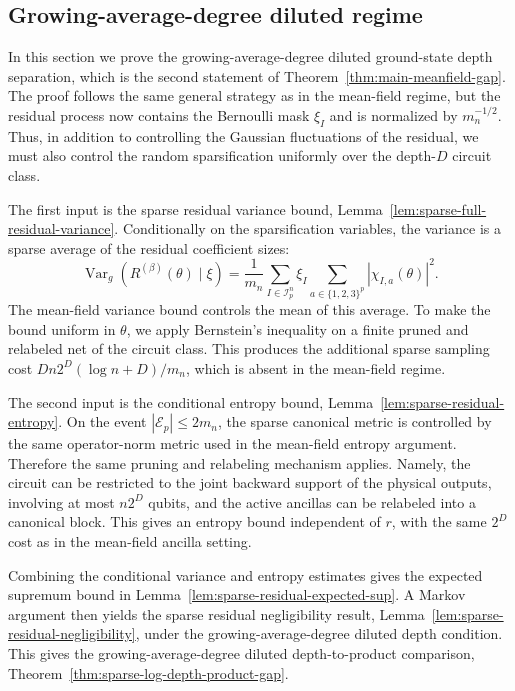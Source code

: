 \documentclass[12pt]{article}
\newcommand{\mcE}{\mathcal{E}}
\newcommand{\mcI}{\mathcal{I}}
\begin{document}
\subsection{Growing-average-degree diluted regime} \label{ssec:growing-average-degree-diluted-regime}

In this section we prove the growing-average-degree diluted ground-state depth separation, which is the second statement of Theorem~\ref{thm:main-meanfield-gap}. The proof follows the same general
strategy as in the mean-field regime, but the residual process now contains the
Bernoulli mask \(\xi_I\) and is normalized by \(m_n^{-1/2}\). Thus, in addition
to controlling the Gaussian fluctuations of the residual, we must also control
the random sparsification uniformly over the depth-\(D\) circuit class.

The first input is the sparse residual variance bound,
Lemma~\ref{lem:sparse-full-residual-variance}. Conditionally on the
sparsification variables, the variance is a sparse average of the residual
coefficient sizes:
\[
    \operatorname{Var}_g(R^{(\beta)}(\theta)\mid \xi)
    =
    \frac1{m_n}
    \sum_{I\in\mcI_p^n}
    \xi_I
    \sum_{a\in\{1,2,3\}^p}
    |\chi_{I,a}(\theta)|^2 .
\]
The mean-field variance bound controls the mean of this average. To make the bound
uniform in \(\theta\), we apply Bernstein's inequality on a finite
pruned and relabeled net of the circuit class. This produces the additional
sparse sampling cost $Dn2^D(\log n+D)/m_n$, which is absent in the mean-field regime.

The second input is the conditional entropy bound,
Lemma~\ref{lem:sparse-residual-entropy}. On the event
\(|\mcE_p|\le 2m_n\), the sparse canonical metric is controlled by the same
operator-norm metric used in the mean-field entropy argument. Therefore the same
pruning and relabeling mechanism applies. Namely, the circuit can be restricted to the joint backward support of the physical outputs, involving at most \(n2^D\) qubits, and the active ancillas can be relabeled into a canonical block. This gives an entropy bound independent of $r$, with the same \(2^D\) cost as in the mean-field ancilla setting.

Combining the conditional variance and entropy estimates gives the expected
supremum bound in Lemma~\ref{lem:sparse-residual-expected-sup}. A Markov
argument then yields the sparse residual negligibility result,
Lemma~\ref{lem:sparse-residual-negligibility}, under the growing-average-degree diluted
depth condition. This gives the growing-average-degree diluted depth-to-product comparison,
Theorem~\ref{thm:sparse-log-depth-product-gap}.
\end{document}
